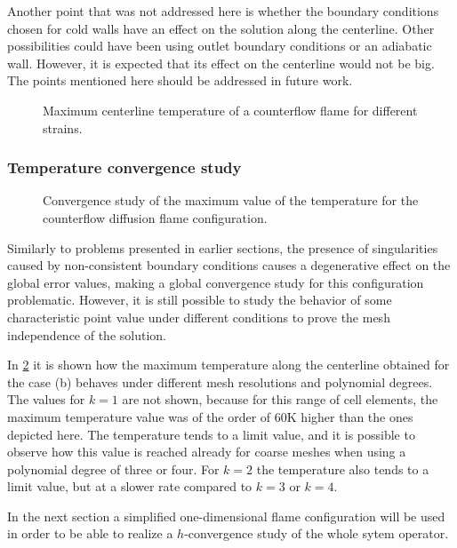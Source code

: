 Another point that was not addressed here is whether the boundary conditions chosen for cold walls have an effect on the solution along the centerline. Other possibilities could have been using outlet boundary conditions or an adiabatic wall. However, it is expected that its effect on the centerline would not be big. The points mentioned here should be addressed in future work.

\begin{figure}[t]
	\centering
	\caption{Maximum centerline temperature of a counterflow flame for different strains.}
	\label{fig:TemperatureStrainPlot}
\end{figure}
\subsubsection{Temperature convergence study}
\begin{figure}[h]
	\centering
	\caption{Convergence study of the maximum value of the temperature for the counterflow diffusion flame configuration.}
	\label{fig:TemperatureConvergenceDiffFlame}
\end{figure}
Similarly to problems presented in earlier sections, the presence of singularities caused by non-consistent boundary conditions causes a degenerative effect on the global error values, making a global convergence study for this configuration problematic. However, it is still possible to study the behavior of some characteristic point value under different conditions to prove the mesh independence of the solution.

In \cref{fig:TemperatureConvergenceDiffFlame} it is shown how the maximum temperature along the centerline obtained for the case (b)  behaves under different mesh resolutions and polynomial degrees. The values for $k=1$ are not shown, because for this range of cell elements, the maximum temperature value was of the order of 60K higher than the ones depicted here. The temperature tends to a limit value, and it is possible to observe how this value is reached already for coarse meshes when using a polynomial degree of three or four. For $k=2$ the temperature also tends to a limit value, but at a slower rate compared to $k =3$ or $k = 4$. 

In the next section a simplified one-dimensional flame configuration will be used in order to be able to realize a $h$-convergence study of the whole sytem operator.

